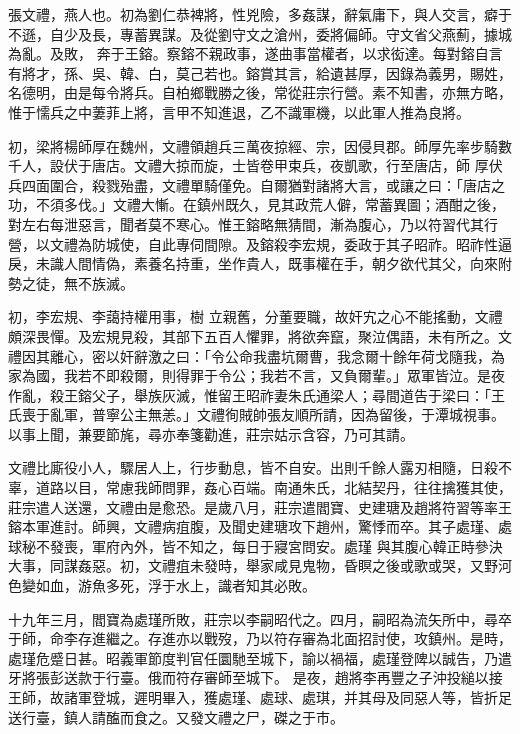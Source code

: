 \begin{pinyinscope}
 張文禮，燕人也。初為劉仁恭裨將，性兇險，多姦謀，辭氣庸下，與人交言，癖于不遜，自少及長，專蓄異謀。及從劉守文之滄州，委將偏師。守文省父燕薊，據城為亂。及敗，
 奔于王鎔。察鎔不親政事，遂曲事當權者，以求衒達。每對鎔自言有將才，孫、吳、韓、白，莫己若也。鎔賞其言，給遺甚厚，因錄為義男，賜姓，名德明，由是每令將兵。自柏鄉戰勝之後，常從莊宗行營。素不知書，亦無方略，惟于懦兵之中萋菲上將，言甲不知進退，乙不識軍機，以此軍人推為良將。



 初，梁將楊師厚在魏州，文禮領趙兵三萬夜掠經、宗，因侵貝郡。師厚先率步騎數千人，設伏于唐店。文禮大掠而旋，士皆卷甲束兵，夜凱歌，行至唐店，師
 厚伏兵四面圍合，殺戮殆盡，文禮單騎僅免。自爾猶對諸將大言，或讓之曰：「唐店之功，不須多伐。」文禮大慚。在鎮州既久，見其政荒人僻，常蓄異圖；酒酣之後，對左右每泄惡言，聞者莫不寒心。惟王鎔略無猜間，漸為腹心，乃以符習代其行營，以文禮為防城使，自此專伺間隙。及鎔殺李宏規，委政于其子昭祚。昭祚性逼戾，未識人間情偽，素養名持重，坐作貴人，既事權在手，朝夕欲代其父，向來附勢之徒，無不族滅。



 初，李宏規、李藹持權用事，樹
 立親舊，分董要職，故奸宄之心不能搖動，文禮頗深畏憚。及宏規見殺，其部下五百人懼罪，將欲奔竄，聚泣偶語，未有所之。文禮因其離心，密以奸辭激之曰：「令公命我盡坑爾曹，我念爾十餘年荷戈隨我，為家為國，我若不即殺爾，則得罪于令公；我若不言，又負爾輩。」眾軍皆泣。是夜作亂，殺王鎔父子，舉族灰滅，惟留王昭祚妻朱氏通梁人；尋間道告于梁曰：「王氏喪于亂軍，普寧公主無恙。」文禮徇賊帥張友順所請，因為留後，于潭城視事。
 以事上聞，兼要節旄，尋亦奉箋勸進，莊宗姑示含容，乃可其請。



 文禮比廝役小人，驟居人上，行步動息，皆不自安。出則千餘人露刃相隨，日殺不辜，道路以目，常慮我師問罪，姦心百端。南通朱氏，北結契丹，往往擒獲其使，莊宗遣人送還，文禮由是愈恐。是歲八月，莊宗遣閻寶、史建瑭及趙將符習等率王鎔本軍進討。師興，文禮病疽腹，及聞史建瑭攻下趙州，驚悸而卒。其子處瑾、處球秘不發喪，軍府內外，皆不知之，每日于寢宮問安。處瑾
 與其腹心韓正時參決大事，同謀姦惡。初，文禮疽未發時，舉家咸見鬼物，昏瞑之後或歌或哭，又野河色變如血，游魚多死，浮于水上，識者知其必敗。



 十九年三月，閻寶為處瑾所敗，莊宗以李嗣昭代之。四月，嗣昭為流矢所中，尋卒于師，命李存進繼之。存進亦以戰歿，乃以符存審為北面招討使，攻鎮州。是時，處瑾危蹙日甚。昭義軍節度判官任圜馳至城下，諭以禍福，處瑾登陴以誠告，乃遣牙將張彭送款于行臺。俄而符存審師至城下。
 是夜，趙將李再豐之子沖投縋以接王師，故諸軍登城，遲明畢入，獲處瑾、處球、處琪，并其母及同惡人等，皆折足送行臺，鎮人請醢而食之。又發文禮之尸，磔之于市。




\end{pinyinscope}
